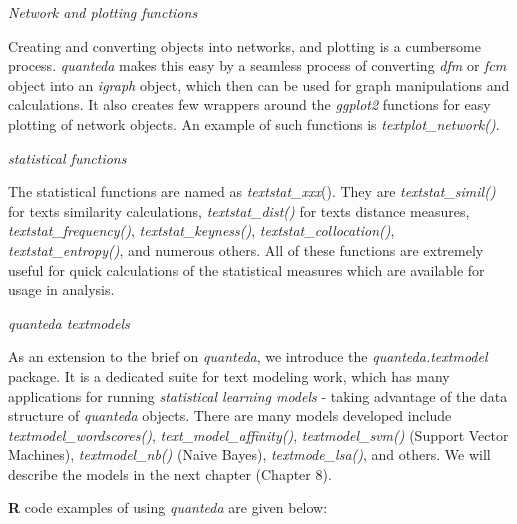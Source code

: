 \documentclass[
]{article}
\begin{document}
\emph{Network and plotting functions}

Creating and converting objects into networks, and plotting is a cumbersome process. \emph{quanteda} makes this easy by a seamless process of converting \emph{dfm} or \emph{fcm} object into an \emph{igraph} object, which then can be used for graph manipulations and calculations. It also creates few wrappers around the \emph{ggplot2} functions for easy plotting of network objects. An example of such functions is \emph{textplot\_network()}.

\emph{statistical functions}

The statistical functions are named as \emph{textstat\_xxx}(). They are \emph{textstat\_simil()} for texts similarity calculations, \emph{textstat\_dist()} for texts distance measures, \emph{textstat\_frequency()}, \emph{textstat\_keyness()}, \emph{textstat\_collocation()}, \emph{textstat\_entropy()}, and numerous others. All of these functions are extremely useful for quick calculations of the statistical measures which are available for usage in analysis.

\emph{quanteda textmodels}

As an extension to the brief on \emph{quanteda}, we introduce the \emph{quanteda.textmodel} package. It is a dedicated suite for text modeling work, which has many applications for running \emph{statistical learning models} - taking advantage of the data structure of \emph{quanteda} objects. There are many models developed include \emph{textmodel\_wordscores()}, \emph{text\_model\_affinity()}, \emph{textmodel\_svm()} (Support Vector Machines), \emph{textmodel\_nb()} (Naive Bayes), \emph{textmode\_lsa()}, and others. We will describe the models in the next chapter (Chapter 8).

\textbf{R} code examples of using \emph{quanteda} are given below:

\footnotesize
\end{document}
